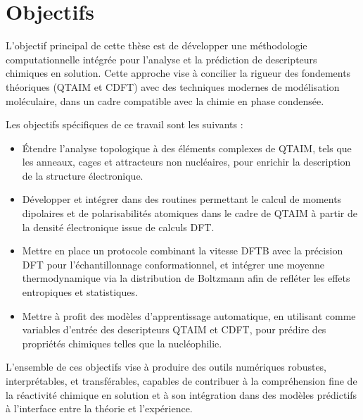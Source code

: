 \section{Objectifs}

L'objectif principal de cette thèse est de développer une méthodologie
computationnelle intégrée pour l'analyse et la prédiction de descripteurs
chimiques en solution. Cette approche vise à concilier la rigueur des
fondements théoriques (\gls{QTAIM} et \gls{CDFT}) avec des techniques modernes
de modélisation moléculaire, dans un cadre compatible avec la chimie en phase
condensée.

Les objectifs spécifiques de ce travail sont les suivants :

\begin{itemize}
  \item Étendre l'analyse topologique à des éléments complexes de \gls{QTAIM},
        tels que les anneaux, cages et attracteurs
        non nucléaires, pour enrichir la description de la structure électronique.
  \item Développer et intégrer dans \ams des routines permettant
        le calcul de moments dipolaires et de polarisabilités atomiques dans le
        cadre de QTAIM à partir de la densité électronique issue de calculs DFT.
  \item Mettre en place un protocole combinant la vitesse \gls{DFTB} avec la
        précision \gls{DFT} pour l'échantillonnage conformationnel, et intégrer une
        moyenne thermodynamique via la distribution de Boltzmann afin de refléter les
        effets entropiques et statistiques.
  \item Mettre à profit des modèles d'apprentissage automatique, en utilisant
        comme variables d'entrée des descripteurs \gls{QTAIM} et \gls{CDFT}, pour
        prédire des propriétés chimiques telles que la nucléophilie.
\end{itemize}

L'ensemble de ces objectifs vise à produire des outils numériques robustes,
interprétables, et transférables, capables de contribuer à la compréhension
fine de la réactivité chimique en solution et à son intégration dans des
modèles prédictifs à l'interface entre la théorie et l'expérience.

